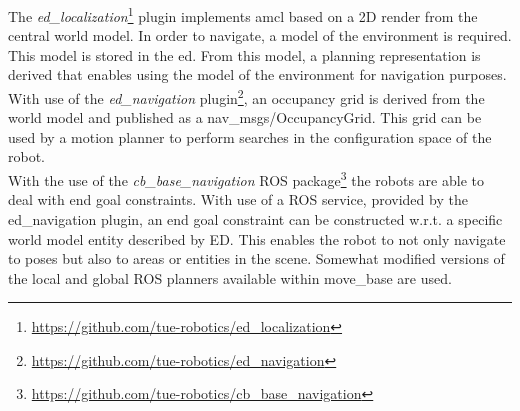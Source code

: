 The \emph{ed_localization}\footnote{\url{https://github.com/tue-robotics/ed_localization}} plugin implements \acrshort{amcl} based on a 2D render from the central world model. In order to navigate, a model of the environment is required. This model is stored in the \acrshort{ed}. From this model, a planning representation is derived that enables using the model of the environment for navigation purposes.
\\
With use of the \emph{ed\_navigation} plugin\footnote{\url{https://github.com/tue-robotics/ed_navigation}}, an occupancy grid is derived from the world model and published as a nav\_msgs/OccupancyGrid. This grid can be used by a motion planner to perform searches in the configuration space of the robot.
\\
With the use of the \emph{cb\_base\_navigation} ROS package\footnote{\url{https://github.com/tue-robotics/cb_base_navigation}} the robots are able to deal with end goal constraints. With use of a ROS service, provided by the ed\_navigation plugin, an end goal constraint can be constructed w.r.t. a specific world model entity described by ED. This enables the robot to not only navigate to poses but also to areas or entities in the scene.
Somewhat modified versions of the local and global ROS planners available within move\_base are used.
